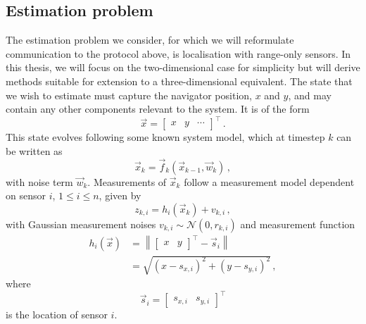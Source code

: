 \subsection{Estimation problem}\label{subsec:nonlin_fusion:estimation_problem}
The estimation problem we consider, for which we will reformulate communication to the protocol above, is localisation with range-only sensors. In this thesis, we will focus on the two-dimensional case for simplicity but will derive methods suitable for extension to a three-dimensional equivalent. The state that we wish to estimate must capture the navigator position, $x$ and $y$, and may contain any other components relevant to the system. It is of the form
\begin{equation}\label{eq:nonlin_fusion:state_definition}
    \vec{x} = 
    \begin{bmatrix}
        x & y & \cdots
    \end{bmatrix}^\top\,.
\end{equation}
This state evolves following some known system model, which at timestep $k$ can be written as
\begin{equation}\label{eq:nonlin_fusion:system_model}
    \vec{x}_k = \vec{f}_k(\vec{x}_{k-1}, \vec{w}_k)\,,
\end{equation}
with noise term $\vec{w}_k$. Measurements of $\vec{x}_k$ follow a measurement model dependent on sensor $i$, $1\leq i\leq n$, given by 
\begin{equation}\label{eq:nonlin_fusion:measurement_model}
    z_{k,i} = h_i(\vec{x}_k)+v_{k,i}\,,
\end{equation}
with Gaussian measurement noises $v_{k,i} \sim \mathcal{N}(0,r_{k,i})$ and measurement function
\begin{equation}
    \begin{split}
        h_i(\vec{x}) &= \left\lVert
        \begin{bmatrix}
            x & y
        \end{bmatrix}^\top
        - \vec{s}_{i}\right\rVert \\
        &= \sqrt{(x-s_{x,i})^2 + (y-s_{y,i})^2}\,,
    \end{split}
\end{equation}
where
\begin{equation}
    \vec{s}_i = 
    \begin{bmatrix}
        s_{x,i} & s_{y,i}
    \end{bmatrix}^\top
\end{equation} 
is the location of sensor $i$.

